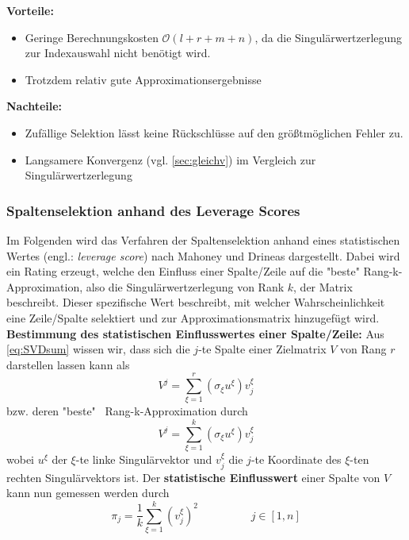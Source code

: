 \documentclass[12pt,a4paper,twoside]{article}
\begin{document}
		\newpage
		\textbf{Vorteile:}
		\begin{itemize}
		\item Geringe Berechnungskosten $\mathcal{O}(l+r+m+n)$, da die Singulärwertzerlegung zur Indexauswahl nicht benötigt wird.
		\item Trotzdem relativ gute Approximationsergebnisse
		\end{itemize}
		\textbf{Nachteile:}
		\begin{itemize}
		\item Zufällige Selektion lässt keine Rückschlüsse auf den größtmöglichen Fehler zu.
		\item Langsamere Konvergenz (vgl. \ref{sec:gleichv}) im Vergleich zur Singulärwertzerlegung
		\end{itemize}
		\subsubsection{Spaltenselektion anhand des Leverage Scores}
		Im Folgenden wird das Verfahren der Spaltenselektion anhand eines statistischen Wertes (engl.: 
		\textit{leverage score}) nach Mahoney und Drineas \citep{mahoney2008} dargestellt. Dabei wird ein Rating erzeugt, welche den 
		Einfluss einer Spalte/Zeile auf die "beste" Rang-k-Approximation, also die Singulärwertzerlegung von Rank $k$, der Matrix beschreibt. Dieser spezifische Wert beschreibt, mit welcher Wahrscheinlichkeit eine Zeile/Spalte selektiert und zur Approximationsmatrix hinzugefügt wird. \newline
		\newline	
		\textbf{Bestimmung des statistischen Einflusswertes einer Spalte/Zeile:} \newline 
		Aus \ref{eq:SVDsum} wissen wir, dass sich die $j$-te Spalte einer Zielmatrix $V$ von Rang $r$ darstellen lassen kann als
		\begin{equation*}
			V^j=\sum_{\xi=1}^r(\sigma_\xi u^\xi )v_j^\xi
		\end{equation*}
		bzw. deren "beste" \ Rang-k-Approximation durch
		\begin{equation*}
			V^j=\sum_{\xi=1}^k(\sigma_\xi u^\xi )v_j^\xi
		\end{equation*}
		wobei $u^\xi$ der $\xi$-te linke Singulärvektor und $v_j^\xi$ die $j$-te Koordinate des $\xi$-ten rechten 
		Singulärvektors ist. Der \textbf{statistische Einflusswert} einer Spalte von $V$ kann nun gemessen werden durch
		\begin{equation}
			\label{eq:score}
			\pi_j=\frac{1}{k}\sum_{\xi=1}^k(v_j^\xi)^2 \hspace{2cm} j\in [1,n]
		\end{equation}
\end{document}
